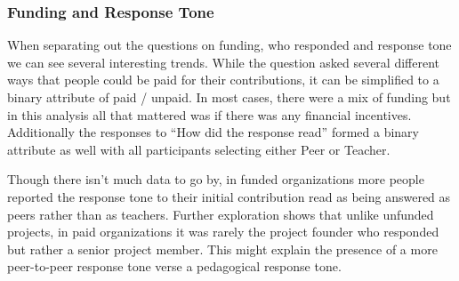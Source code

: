 \subsubsection{Funding and Response Tone}
When separating out the questions on funding, who responded and response tone we can see several interesting trends. While the question asked several different ways that people could be paid for their contributions, it can be simplified to a binary attribute of paid / unpaid. In most cases, there were a mix of funding but in this analysis all that mattered was if there was any financial incentives. Additionally the responses to “How did the response read” formed a binary attribute as well with all participants selecting either Peer or Teacher.

Though there isn’t much data to go by, in funded organizations more people reported the response tone to their initial contribution read as being answered as peers rather than as teachers. Further exploration shows that unlike unfunded projects, in paid organizations it was rarely the project founder who responded but rather a senior project member. This might explain the presence of a more peer-to-peer response tone verse a pedagogical response tone.